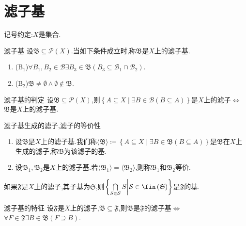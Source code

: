 \section{滤子基}

记号约定:$X$是集合.

\begin{definition}{滤子基}{}
	设$\mathfrak{B}\subseteq\mathcal{P}\left(X\right)$.当如下条件成立时,称$\mathfrak{B}$是$X$上的滤子基.
	\begin{enumerate}
		\item ($\mathrm{B}_{1}$)$\forall B_{1},B_{2}\in\mathcal{B}\exists B_{3}\in\mathfrak{B}\left(B_{3}\subseteq\mathcal{B}_{1}\cap\mathcal{B}_{2}\right)$.
		\item ($\mathrm{B}_{2}$)$\mathfrak{B}\neq\emptyset\wedge\emptyset\notin\mathfrak{B}$.
	\end{enumerate}
\end{definition}

\begin{proposition}{滤子基的判定}{}
	设$\mathfrak{B}\subseteq\mathcal{P}\left(X\right)$,则$\left\{A\subseteq X\middle|\exists B\in\mathcal{B}\left(B\subseteq A\right)\right\}$是$X$上的滤子$\iff$ $\mathfrak{B}$是$X$上的滤子基.
\end{proposition}

\begin{definition}{滤子基生成的滤子,滤子的等价性}{}
	\begin{enumerate}
		\item 设$\mathfrak{B}$是$X$上的滤子基.我们称$\langle\mathfrak{B}\rangle\coloneq\left\{A\subseteq X\middle|\exists B\in\mathfrak{B}\left(B\subseteq A\right)\right\}$是$\mathfrak{B}$在$X$上生成的滤子,称$\mathfrak{B}$为该滤子的基.
		\item 设$\mathfrak{B}_{1},\mathfrak{B}_{2}$是$X$上的滤子基.若$\langle\mathfrak{B}_{1}\rangle=\langle\mathfrak{B}_{2}\rangle$,则称$\mathfrak{B}_{1}$和$\mathfrak{B}_{2}$等价.
	\end{enumerate}
\end{definition}

\begin{remark}{}{}
	如果$\mathfrak{F}$是$X$上的滤子,其子基为$\mathfrak{S}$,则$\left\{\bigcap\limits_{S\in\mathcal{S}}S\middle|\mathcal{S}\in\fin\left(\mathfrak{S}\right)\right\}$是$\mathfrak{F}$的基.
\end{remark}

\begin{proposition}{滤子基的特征}{}
	设$\mathfrak{F}$是$X$上的滤子,$\mathfrak{B}\subseteq\mathfrak{F}$,则$\mathfrak{B}$是$\mathfrak{F}$的滤子基$\iff$ $\forall F\in\mathfrak{F}\exists B\in\mathfrak{B}\left(F\supseteq B\right)$.
\end{proposition}

